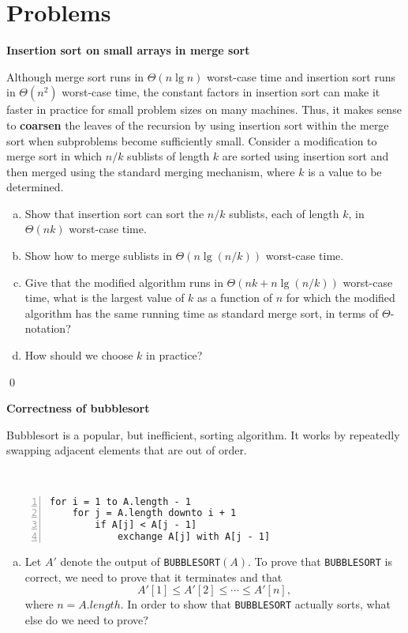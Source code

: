 \section{Problems}

 \textbf{Insertion sort on small arrays in merge sort}

Although merge sort runs in $\Theta(n \lg n)$ worst-case time and insertion sort runs in $\Theta(n^2)$ worst-case time, the constant factors in insertion sort can make it faster in practice for small problem sizes on many machines. Thus, it makes sense to \textbf{coarsen} the leaves of the recursion by using insertion sort within the merge sort when subproblems become sufficiently small. Consider a modification to merge sort in which $n/k$ sublists of length $k$ are sorted using insertion sort and then merged using the standard merging mechanism, where $k$ is a value to be determined.

\begin{enumerate}[(a)]
    \item Show that insertion sort can sort the $n/k$ sublists, each of length $k$, in $\Theta(nk)$ worst-case time.
    \item Show how to merge sublists in $\Theta(n \lg(n/k))$ worst-case time.
    \item Give that the modified algorithm runs in $\Theta(nk + n\lg(n/k))$ worst-case time, what is the largest value of $k$ as a function of $n$ for which the modified algorithm has the same running time as standard merge sort, in terms of $\Theta$-notation?
    \item How should we choose $k$ in practice?
\end{enumerate}

\sol \qed

 \textbf{Correctness of bubblesort}

Bubblesort is a popular, but inefficient, sorting algorithm. It works by repeatedly swapping adjacent elements that are out of order.

\,

\begin{Verbatim}[frame=single,numbers=left,samepage=true,label={BUBBLESORT(A)}]
for i = 1 to A.length - 1
    for j = A.length downto i + 1
        if A[j] < A[j - 1]
            exchange A[j] with A[j - 1]
\end{Verbatim}

\begin{enumerate}[(a)]
    \item Let $A'$ denote the output of \verb|BUBBLESORT|$(A)$. To prove that \verb|BUBBLESORT| is correct, we need to prove that it terminates and that \begin{equation}A'[1] \leq A'[2] \leq \cdots \leq A'[n],\end{equation} where $n = A.length$. In order to show that \verb|BUBBLESORT| actually sorts, what else do we need to prove?
\end{enumerate}

